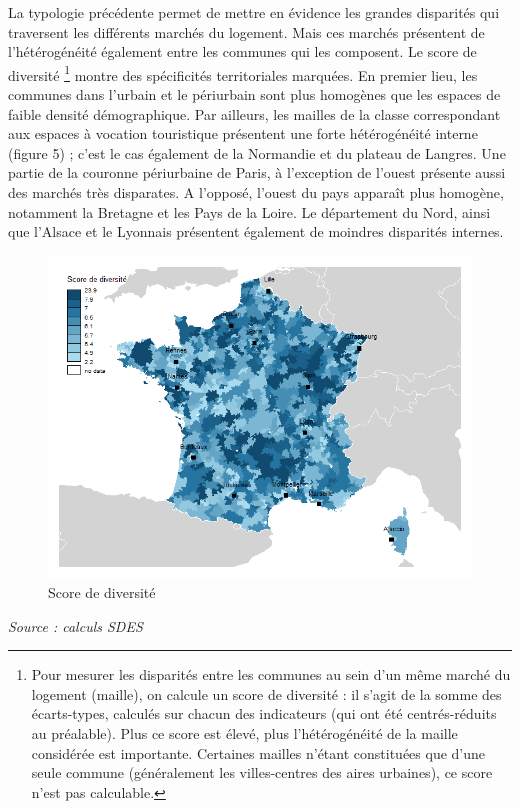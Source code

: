 \documentclass[12pt, a4paper]{article}
\begin{document}
La typologie précédente permet de mettre en évidence les grandes disparités qui traversent les différents marchés du logement. Mais ces marchés présentent de l'hétérogénéité également entre les communes qui les composent. Le score de diversité \footnote{Pour mesurer les disparités entre les communes au sein d'un même marché du logement (maille), on calcule un score de diversité : il s'agit de la somme des écarts-types, calculés sur chacun des indicateurs (qui ont été centrés-réduits au préalable). Plus ce score est élevé, plus l'hétérogénéité de la maille considérée est importante. Certaines mailles n'étant constituées que d'une seule commune (généralement les villes-centres des aires urbaines), ce score n'est pas calculable.} montre des spécificités territoriales marquées. En premier lieu, les communes dans l'urbain et le périurbain sont plus homogènes que les espaces de faible densité démographique. Par ailleurs, les mailles de la classe correspondant aux espaces à vocation touristique présentent une forte hétérogénéité interne (figure 5) ; c'est le cas également de la Normandie et du plateau de Langres. Une partie de la couronne périurbaine de Paris, à l'exception de l'ouest présente aussi des marchés très disparates. A l'opposé, l'ouest du pays apparaît plus homogène, notamment la Bretagne et les Pays de la Loire. Le département du Nord, ainsi que l'Alsace et le Lyonnais présentent également de moindres disparités internes.

\begin{figure}[H]
\caption{Score de diversité}
\begin{center}
\includegraphics[scale=.8]{img/Diversite.png}
\end{center}
\end{figure}
\emph{Source : calculs SDES}
\end{document}
